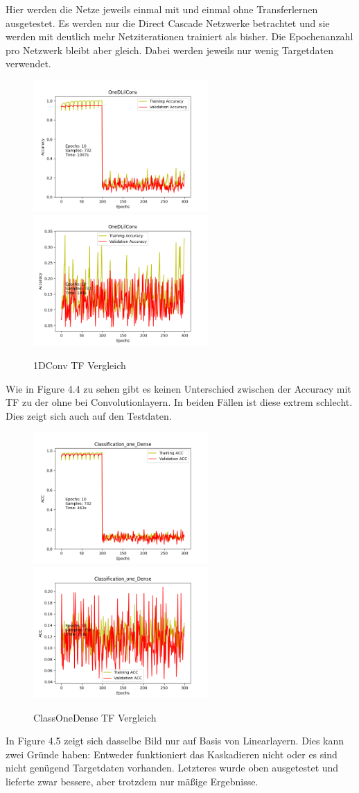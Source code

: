 Hier werden die Netze jeweils einmal mit und einmal ohne Transferlernen ausgetestet. Es werden nur die Direct Cascade Netzwerke betrachtet und 
sie werden mit deutlich mehr Netziterationen trainiert als bisher. Die Epochenanzahl pro Netzwerk bleibt aber gleich. Dabei werden jeweils nur 
wenig Targetdaten verwendet. 

\begin{figure}[htpb]
    \includegraphics[height=5cm]{../../Plots/ba_plots/classTF/1dc_tr.png}
    \includegraphics[height=5cm]{../../Plots/ba_plots/classTF/wo1dc_tr.png}
    \caption{\label{fig:1dc_tr} 1DConv TF Vergleich}
\end{figure}

Wie in Figure 4.4 zu sehen gibt es keinen Unterschied zwischen der Accuracy mit TF zu der ohne bei Convolutionlayern. In beiden Fällen ist diese 
extrem schlecht. Dies zeigt sich auch auf den Testdaten. 

\begin{figure}[htpb]
    \includegraphics[height=5cm]{../../Plots/ba_plots/classTF/cod_tr.png}
    \includegraphics[height=5cm]{../../Plots/ba_plots/classTF/wocod_tr.png}
    \caption{\label{fig:cod_tr} ClassOneDense TF Vergleich}
\end{figure}

In Figure 4.5 zeigt sich dasselbe Bild nur auf Basis von Linearlayern. Dies kann zwei Gründe haben: Entweder funktioniert das Kaskadieren nicht 
oder es sind nicht genügend Targetdaten vorhanden. Letzteres wurde oben ausgetestet und lieferte zwar bessere, aber trotzdem nur mäßige Ergebnisse. 
